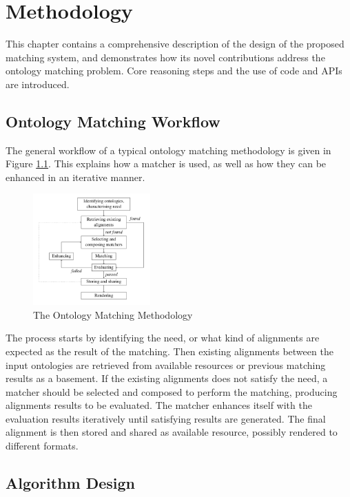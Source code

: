 \chapter{Methodology}

This chapter contains a comprehensive description of the design of the proposed matching system, and demonstrates how its novel contributions address the ontology matching problem. Core reasoning steps and the use of code and APIs are introduced.

\section{Ontology Matching Workflow}

The general workflow of a typical ontology matching methodology is given in Figure \ref{fig:methodology1}. This explains how a matcher is used, as well as how they can be enhanced in an iterative manner.

\begin{figure}[ht]
\begin{center}
\includegraphics[width=0.4\textwidth]{img/methodology1.png}
\caption{The Ontology Matching Methodology}
\label{fig:methodology1}
\end{center}
\end{figure}

The process starts by identifying the need, or what kind of alignments are expected as the result of the matching. Then existing alignments between the input ontologies are retrieved from available resources or previous matching results as a basement. If the existing alignments does not satisfy the need, a matcher should be selected and composed to perform the matching, producing alignments results to be evaluated. The matcher enhances itself with the evaluation results iteratively until satisfying results are generated. The final alignment is then stored and shared as available resource, possibly rendered to different formats.

\section{Algorithm Design}

